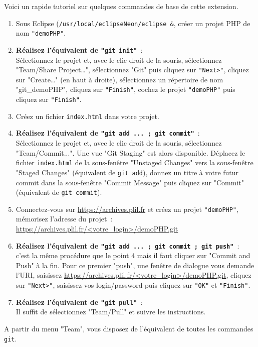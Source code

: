 \documentclass[final, a4paper, openbib, ]{article}
\begin{document}
Voici un rapide tutoriel sur quelques commandes de base de cette extension.
\begin{enumerate}
	\item Sous Eclipse (\texttt{/usr/local/eclipseNeon/eclipse \&}, créer un projet PHP de nom \texttt{"demoPHP"}.
	\item {\bf Réalisez l'équivalent de \texttt{"git init"}}~:\\
	Sélectionnez le projet et, avec le clic droit de la souris, sélectionnez "Team/Share Project\ldots", sélectionnez "Git" puis cliquez sur \texttt{"Next>"}, cliquez sur "Create\ldots" (en haut à droite), sélectionnez un répertoire de nom "git\_demoPHP", cliquez sur \texttt{"Finish"}, cochez le projet \texttt{"demoPHP"} puis cliquez sur \texttt{"Finish"}.
	\item Créez un fichier \texttt{index.html} dans votre projet.
	\item {\bf Réalisez l'équivalent de \texttt{"git add ... ; git commit"}}~:\\
	Sélectionnez le projet et, avec le clic droit de la souris, sélectionnez "Team/Commit...". Une vue "Git Staging" est alors disponible. Déplacez le fichier \texttt{index.html} de la sous-fenêtre "Unstaged Changes" vers la sous-fenêtre "Staged Changes" (équivalent de \texttt{git add}), donnez un titre à votre futur commit dans la sous-fenêtre "Commit Message" puis cliquez sur "Commit" (équivalent de \texttt{git commit}).
	\item Connectez-vous sur \url{https://archives.plil.fr} et créez un projet \texttt{"demoPHP"}, mémorisez l'adresse du projet~: \url{https://archives.plil.fr/<votre_login>/demoPHP.git}
	\item {\bf Réalisez l'équivalent de \texttt{"git add ... ; git commit ; git push"}}~:\\
	c'est la même procédure que le point 4 mais il faut cliquer sur "Commit and Push" à la fin. Pour ce premier "push", une fenêtre de dialogue vous demande l'URI, saisissez \url{https://archives.plil.fr/<votre_login>/demoPHP.git}, cliquez sur \texttt{"Next>"}, saisissez vos login/password puis cliquez sur \texttt{"OK"} et \texttt{"Finish"}.
	\item {\bf Réalisez l'équivalent de \texttt{"git pull"}}~:\\
	Il suffit de sélectionnez "Team/Pull" et suivre les instructions.
\end{enumerate}

A partir du menu "Team", vous disposez de l'équivalent de toutes les commandes \texttt{git}.
\end{document}
